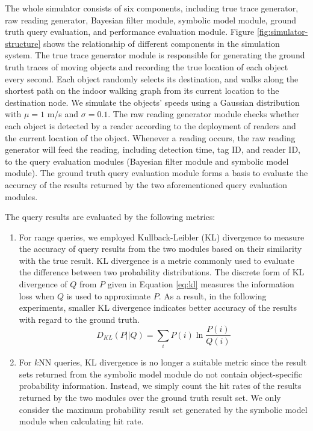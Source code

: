 \documentclass[12pt]{report}
\begin{document}
The whole simulator consists of six components, including true
trace generator, raw reading generator, Bayesian filter module,
symbolic model module, ground truth query evaluation, and
performance evaluation module.  Figure \ref{fig:simulator-structure}
shows the relationship of different components in the simulation
system.  The true trace generator module is responsible for
generating the ground truth traces of moving objects and recording
the true location of each object every second.  Each object
randomly selects its destination, and walks along the shortest path
on the indoor walking graph from its current location to the
destination node.  We simulate the objects' speeds using a Gaussian
distribution with \(\mu=1\) m/s and \(\sigma=0.1\).  The raw
reading generator module checks whether each object is detected by
a reader according to the deployment of readers and the current
location of the object.  Whenever a reading occurs, the raw reading
generator will feed the reading, including detection time, tag ID,
and reader ID, to the query evaluation modules (Bayesian filter
module and symbolic model module).  The ground truth query
evaluation module forms a basis to evaluate the accuracy of the
results returned by the two aforementioned query evaluation
modules.

The query results are evaluated by the following metrics:
\begin{enumerate}
\item For range queries, we employed Kullback-Leibler (KL) divergence
\cite{kullback1951-information} to measure the accuracy of query
results from the two modules based on their similarity with the
true result.  KL divergence is a metric commonly used to
evaluate the difference between two probability distributions.
The discrete form of KL divergence of \(Q\) from \(P\) given in
Equation \eqref{eq:kl} measures the information loss when \(Q\) is
used to approximate \(P\).  As a result, in the following
experiments, smaller KL divergence indicates better accuracy of
the results with regard to the ground truth.
\begin{equation} \label{eq:kl}
  D_{KL}(P||Q) = \sum_{i}P(i) \ln \frac{P(i)}{Q(i)}
\end{equation}
\item For \(k\)NN queries, KL divergence is no longer a suitable
metric since the result sets returned from the symbolic model
module do not contain object-specific probability information.
Instead, we simply count the hit rates of the results returned
by the two modules over the ground truth result set.  We only
consider the maximum probability result set generated by the
symbolic model module when calculating hit rate.
\end{enumerate}
\end{document}
